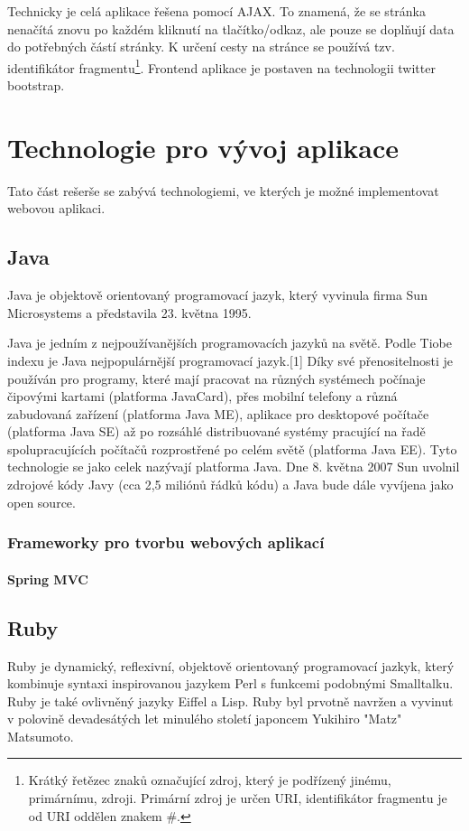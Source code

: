 Technicky je celá aplikace řešena pomocí AJAX. To znamená, že se stránka nenačítá znovu po každém kliknutí na tlačítko/odkaz, ale pouze se doplňují data do potřebných částí stránky. K určení cesty na stránce se používá tzv. identifikátor fragmentu\footnote{Krátký řetězec znaků označující zdroj, který je podřízený jinému, primárnímu, zdroji. Primární zdroj je určen URI, identifikátor fragmentu je od URI oddělen znakem \#.}. Frontend aplikace je postaven na technologii twitter bootstrap.

\section{Technologie pro vývoj aplikace}
Tato část rešerše se zabývá technologiemi, ve kterých je možné implementovat webovou aplikaci. 
\subsection{Java}
Java je objektově orientovaný programovací jazyk, který vyvinula firma Sun Microsystems a představila 23. května 1995.

Java je jedním z nejpoužívanějších programovacích jazyků na světě. Podle Tiobe indexu je Java nejpopulárnější programovací jazyk.[1] Díky své přenositelnosti je používán pro programy, které mají pracovat na různých systémech počínaje čipovými kartami (platforma JavaCard), přes mobilní telefony a různá zabudovaná zařízení (platforma Java ME), aplikace pro desktopové počítače (platforma Java SE) až po rozsáhlé distribuované systémy pracující na řadě spolupracujících počítačů rozprostřené po celém světě (platforma Java EE). Tyto technologie se jako celek nazývají platforma Java. Dne 8. května 2007 Sun uvolnil zdrojové kódy Javy (cca 2,5 miliónů řádků kódu) a Java bude dále vyvíjena jako open source.
\subsubsection{Frameworky pro tvorbu webových aplikací}
\paragraph{Spring MVC}
\subsection{Ruby}
Ruby je dynamický, reflexivní, objektově orientovaný programovací jazkyk, který kombinuje syntaxi inspirovanou jazykem Perl s funkcemi podobnými Smalltalku. Ruby je také ovlivněný jazyky Eiffel a Lisp. Ruby byl prvotně navržen a vyvinut v polovině devadesátých let minulého století japoncem Yukihiro "Matz" Matsumoto.

